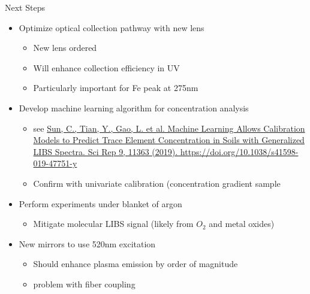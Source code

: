 \documentclass{beamer}
\begin{document}
\begin{frame}{Next Steps}
    \begin{itemize}
        \item Optimize optical collection pathway with new lens
        \begin{itemize}
            \item New lens ordered
            \item Will enhance collection efficiency in UV 
            \item Particularly important for Fe peak at 275nm
        \end{itemize}
        \item Develop machine learning algorithm for concentration analysis 
        \begin{itemize}
            \item see \href{https://www.nature.com/articles/s41598-019-47751-y}{Sun, C., Tian, Y., Gao, L. et al. Machine Learning Allows Calibration Models to Predict Trace Element Concentration in Soils with Generalized LIBS Spectra. Sci Rep 9, 11363 (2019). https://doi.org/10.1038/s41598-019-47751-y}
            \item Confirm with univariate calibration (concentration gradient sample
        \end{itemize}
        \item Perform experiments under blanket of argon
        \begin{itemize}
            \item Mitigate molecular LIBS signal (likely from $O_2$ and metal oxides)
        \end{itemize}
        \item New mirrors to use 520nm excitation
        \begin{itemize}
            \item Should enhance plasma emission by order of magnitude 
            \item problem with fiber coupling 
        \end{itemize}
    \end{itemize}
\end{frame}
\end{document}
